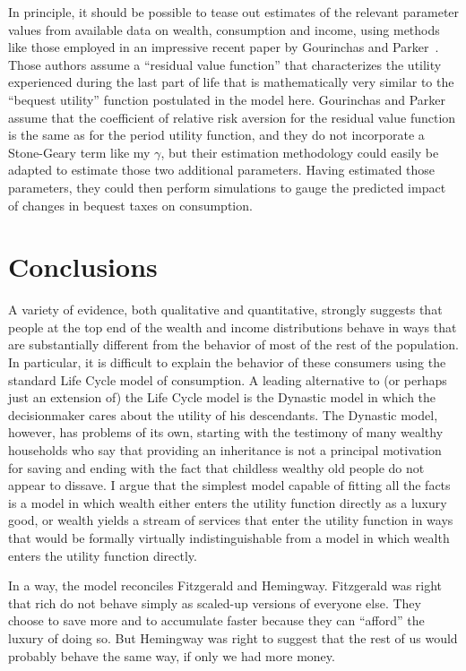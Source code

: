\documentclass[titlepage,12pt]{article}
\begin{document}
In principle, it should be possible to tease out estimates of the 
relevant parameter values from available data on wealth, consumption 
and income, using methods like those employed in an impressive recent 
paper by Gourinchas and Parker~\citeyear{gpLifeCycle}.  
Those authors assume a ``residual value function'' that characterizes 
the utility experienced during the last part of life that is 
mathematically very similar to the ``bequest utility'' function 
postulated in the model here.  Gourinchas and Parker assume that the 
coefficient of relative risk aversion for the residual value function 
is the same as for the period utility function, and they do not 
incorporate a Stone-Geary term like my $\gamma$, but their estimation 
methodology could easily be adapted to estimate those two additional 
parameters.  Having estimated those parameters, they could then 
perform simulations to gauge the predicted impact of changes in 
bequest taxes on consumption.  

\hypertarget{conclusion}{}
\section{Conclusions}
A variety of evidence, both qualitative and quantitative, strongly 
suggests that people at the top end of the wealth and income 
distributions behave in ways that are substantially different from the 
behavior of most of the rest of the population.  In particular, it is 
difficult to explain the behavior of these consumers using the 
standard Life Cycle model of consumption.  A leading alternative to 
(or perhaps just an extension of) the Life Cycle model is the Dynastic 
model in which the decisionmaker cares about the utility of his 
descendants.  The Dynastic model, however, has problems of its own, 
starting with the testimony of many wealthy households who say that 
providing an inheritance is not a principal motivation for saving and 
ending with the fact that childless wealthy old people do not appear to 
dissave.  I argue that the simplest model capable of fitting all the 
facts is a model in which wealth either enters the utility function 
directly as a luxury good, or wealth yields a stream of services that 
enter the utility function in ways that would be formally virtually 
indistinguishable from a model in which wealth enters the utility 
function directly.

In a way, the model reconciles Fitzgerald and Hemingway.  Fitzgerald 
was right that rich do not behave simply as scaled-up versions of 
everyone else.  They choose to save more and to accumulate faster 
because they can ``afford'' the luxury of doing so.  But Hemingway was 
right to suggest that the rest of us would probably behave the same 
way, if only we had more money.
\end{document}
